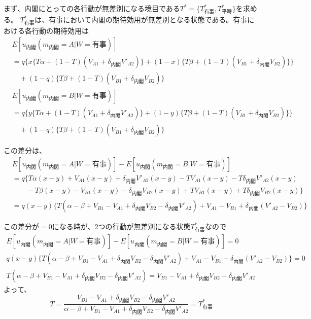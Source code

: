 \documentclass[main.tex]{subfiles}
\begin{document}
まず、内閣にとっての各行動が無差別になる境目である$T^* = \lbrace T^*_{有事}, T^*_{平時} \rbrace$を求める。
$T^*_{有事}$は、有事において内閣の期待効用が無差別となる状態である。有事における各行動の期待効用は
\begin{align*}
    & E[u_{内閣}(m_{内閣}=A|W=有事)]\\
    & = q\Big\lbrace 
        x \lbrace T\alpha + (1-T)(V_{A1} + \delta_{内閣} V'_{A2}) \rbrace + (1-x)\lbrace T\beta + (1-T)(V_{B1} + \delta_{内閣} V_{B2}) \rbrace 
        \Big\rbrace\\
    & \quad +(1-q)\lbrace T\beta + (1-T)(V_{B1} + \delta_{内閣} V_{B2}) \rbrace
\end{align*}
\begin{align*}
    & E[u_{内閣}(m_{内閣}=B|W=有事)]\\
    & = q\Big\lbrace
        y \lbrace T\alpha + (1-T)(V_{A1} + \delta_{内閣} V'_{A2}) \rbrace + (1-y)\lbrace T\beta + (1-T)(V_{B1} + \delta_{内閣} V_{B2}) \rbrace 
        \Big\rbrace\\
    & \quad +(1-q)\lbrace T\beta + (1-T)(V_{B1} + \delta_{内閣} V_{B2}) \rbrace
\end{align*}

\noindent
この差分は、
\begin{align*}
    & E[u_{内閣}(m_{内閣}=A|W=有事)] - E[u_{内閣}(m_{内閣}=B|W=有事)]\\
    & = q\Big\lbrace
        T\alpha(x-y) + V_{A1}(x-y) + \delta_{内閣}V'_{A2}(x-y) - TV_{A1}(x-y) - T\delta_{内閣}V'_{A2}(x-y) \\
    &   \quad\quad -T\beta(x-y) - V_{B1}(x-y) - \delta_{内閣}V_{B2}(x-y) + TV_{B1}(x-y) + T\delta_{内閣}V_{B2}(x-y)
        \Big\rbrace\\
    & = q(x-y) \lbrace T(\alpha-\beta + V_{B1}-V_{A1} + \delta_{内閣}V_{B2} - \delta_{内閣}V'_{A2}) 
                +V_{A1} - V_{B1} + \delta_{内閣}(V'_{A2} - V_{B2}) \rbrace
\end{align*}

\noindent
この差分が$=0$になる時が、2つの行動が無差別になる状態$T^*_{有事}$なので
\begin{gather*}
    E[u_{内閣}(m_{内閣}=A|W=有事)] - E[u_{内閣}(m_{内閣}=B|W=有事)] = 0　\\
    q(x-y) \lbrace T(\alpha-\beta + V_{B1}-V_{A1} + \delta_{内閣}V_{B2} - \delta_{内閣}V'_{A2}) 
                +V_{A1} - V_{B1} + \delta_{内閣}(V'_{A2} - V_{B2})  \rbrace = 0 \\
    T(\alpha-\beta + V_{B1}-V_{A1} + \delta_{内閣}V_{B2} - \delta_{内閣}V'_{A2}) 
    = V_{B1} - V_{A1} +\delta_{内閣}V_{B2} - \delta_{内閣}V'_{A2}
\end{gather*}
よって、
$$T = \frac{ V_{B1} - V_{A1} +\delta_{内閣}V_{B2} - \delta_{内閣}V'_{A2} }{ \alpha-\beta + V_{B1}-V_{A1} + \delta_{内閣}V_{B2} - \delta_{内閣}V'_{A2} }
= T^*_{有事}$$
\end{document}
